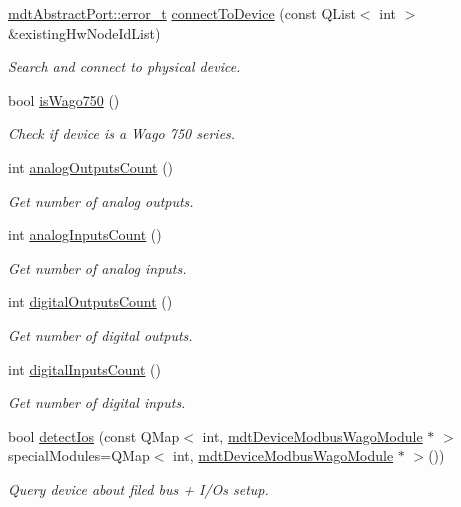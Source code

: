 \begin{DoxyCompactItemize}
\hyperlink{classmdt_abstract_port_ad4121bb930c95887e77f8bafa065a85e}{mdt\-Abstract\-Port\-::error\-\_\-t} \hyperlink{classmdt_device_modbus_wago_aeebc68749c2e22beacd18d85cc0b313a}{connect\-To\-Device} (const Q\-List$<$ int $>$ \&existing\-Hw\-Node\-Id\-List)
\begin{DoxyCompactList}\small\item\em Search and connect to physical device. \end{DoxyCompactList}\item 
bool \hyperlink{classmdt_device_modbus_wago_a6f01ba89d90ddfbcaa0cbda1885d22f1}{is\-Wago750} ()
\begin{DoxyCompactList}\small\item\em Check if device is a Wago 750 series. \end{DoxyCompactList}\item 
int \hyperlink{classmdt_device_modbus_wago_ad812b7ee3a2f2677cddde205da5ec787}{analog\-Outputs\-Count} ()
\begin{DoxyCompactList}\small\item\em Get number of analog outputs. \end{DoxyCompactList}\item 
int \hyperlink{classmdt_device_modbus_wago_a9da56c13404fd9243c5920ff2ef8bd15}{analog\-Inputs\-Count} ()
\begin{DoxyCompactList}\small\item\em Get number of analog inputs. \end{DoxyCompactList}\item 
int \hyperlink{classmdt_device_modbus_wago_a6711c4e486c3b103b187102685e091cc}{digital\-Outputs\-Count} ()
\begin{DoxyCompactList}\small\item\em Get number of digital outputs. \end{DoxyCompactList}\item 
int \hyperlink{classmdt_device_modbus_wago_ad51fd45858e62c597ba8fc2bf3e877bd}{digital\-Inputs\-Count} ()
\begin{DoxyCompactList}\small\item\em Get number of digital inputs. \end{DoxyCompactList}\item 
bool \hyperlink{classmdt_device_modbus_wago_aae46b00317190b70a59080e9b2917ed6}{detect\-Ios} (const Q\-Map$<$ int, \hyperlink{classmdt_device_modbus_wago_module}{mdt\-Device\-Modbus\-Wago\-Module} $\ast$ $>$ special\-Modules=Q\-Map$<$ int, \hyperlink{classmdt_device_modbus_wago_module}{mdt\-Device\-Modbus\-Wago\-Module} $\ast$ $>$())
\begin{DoxyCompactList}\small\item\em Query device about filed bus + I/\-Os setup. \end{DoxyCompactList}\end{DoxyCompactItemize}
